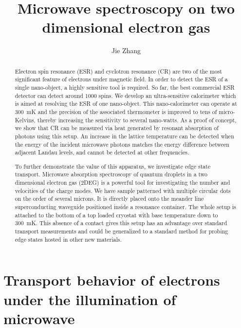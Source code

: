 \documentclass[12pt]{ruthesis}
\title{Microwave spectroscopy on two dimensional electron gas}
\author{Jie Zhang}
\begin{document}
  \begin{frontmatter}
   \maketitle

\begin{abstract}

Electron spin resonance (ESR) and cyclotron resonance (CR) are two of the most significant feature of electrons under magnetic field.
In order to detect the ESR of a single nano-object, a highly sensitive tool is required.
So far, the best commercial ESR detector can detect around 1000 spins.
We develop an ultra-sensitive calorimeter which is aimed at resolving the ESR of one nano-object.
This nano-calorimeter can operate at \SI{300}{\milli\kelvin} and the precision of the associated thermometer is improved to tens of micro-Kelvins, thereby increasing the sensitivity to several nano-watts.
As a proof of concept, we show that CR can be measured via heat generated by resonant absorption of photons using this setup.
An increase in the lattice temperature can be detected when the energy of the incident microwave photons matches the energy difference between adjacent Landau levels, and cannot be detected at other frequencies.

To further demonstrate the value of this apparatus, we investigate edge state transport.
Microwave absorption spectroscopy of quantum droplets in a two dimensional electron gas (2DEG) is a powerful tool for investigating the number and velocities of the charge modes.
We have sample patterned with multiple circular dots on the order of several microns.
It is directly placed onto the meander line superconducting waveguide positioned inside a resonance container.
The whole setup is attached to the bottom of a top loaded  cryostat with base temperature down to \SI{300}{\milli\kelvin}.
This absence of a contact gives this setup has an advantage over standard transport measurements and could be generalized to a standard method for probing edge states hosted in other new materials.


\end{abstract}

%
\tableofcontents
\listoffigures
%   
\end{frontmatter}



\chapter{Transport behavior of electrons under the illumination of microwave}\label{Transport}
\end{document}
